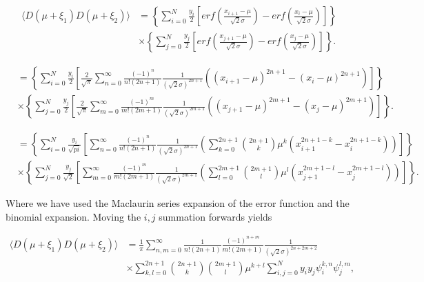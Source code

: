 \documentclass[apj]{emulateapj}
\begin{document}
\begin{equation}
\begin{aligned}
\langle D(\mu + \xi_1) D(\mu + \xi_2) \rangle &= \left\{ \sum_{i=0}^N  \frac{y_i}{2} \left[ erf \left( \frac{x_{i+1} - \mu}{\sqrt{2}\sigma} \right) - erf \left( \frac{x_{i} - \mu}{\sqrt{2}\sigma} \right) \right] \right\} \\
&\times \left\{  \sum_{j=0}^N \frac{y_j}{2} \left[ erf \left( \frac{x_{j+1} - \mu}{\sqrt{2}\sigma} \right) - erf \left( \frac{x_{j} - \mu}{\sqrt{2}\sigma} \right) \right] \right\}.
\end{aligned}
\end{equation}

\begin{equation}
\begin{aligned}
&= \left\{ \sum_{i=0}^N  \frac{y_i}{2} \left[ \frac{2}{\sqrt{\pi}} \sum_{n = 0}^\infty \frac{(-1)^n}{n! (2n+1)} \frac{1}{(\sqrt{2}\sigma)^{2n+1}} \left( (x_{i+1}-\mu)^{2n+1} - (x_{i}-\mu)^{2n+1} \right) \right] \right\} \\
&\times \left\{ \sum_{j=0}^N  \frac{y_j}{2} \left[ \frac{2}{\sqrt{\pi}} \sum_{m = 0}^\infty \frac{(-1)^m}{m! (2m+1)} \frac{1}{(\sqrt{2}\sigma)^{2m+1}} \left( (x_{j+1}-\mu)^{2m+1} - (x_{j}-\mu)^{2m+1} \right) \right] \right\}.
\end{aligned}
\end{equation}

\begin{equation}
\begin{aligned}
&= \left\{ \sum_{i=0}^N  \frac{y_i}{\sqrt{pi}} \left[ \sum_{n = 0}^\infty \frac{(-1)^n}{n! (2n+1)} \frac{1}{(\sqrt{2}\sigma)^{2n+1}} \left( \sum_{k=0}^{2n+1} {2n+1 \choose k} \mu^k ( x_{i+1}^{2n+1-k} - x_{i}^{2n+1-k} ) \right) \right] \right\} \\
&\times \left\{ \sum_{j=0}^N  \frac{y_j}{\sqrt{2}} \left[ \sum_{m = 0}^\infty \frac{(-1)^m}{m! (2m+1)} \frac{1}{(\sqrt{2}\sigma)^{2m+1}} \left( \sum_{l=0}^{2m+1} {2m+1 \choose l} \mu^l ( x_{j+1}^{2m+1-l} - x_{j}^{2m+1-l} ) \right) \right] \right\}.
\end{aligned}
\end{equation}

Where we have used the Maclaurin series expansion of the error function and the binomial expansion. Moving the $i, j$ summation forwards yields

\begin{equation} \label{eq:dcompleteklsum}
\begin{aligned}
\langle D(\mu + \xi_1) D(\mu + \xi_2) \rangle &=  \frac{1}{\pi} \sum_{n,m = 0}^\infty \frac{1}{n! (2n+1)} \frac{(-1)^{n+m}}{m! (2m+1)} \frac{1}{(\sqrt{2}\sigma)^{2n+2m+2}} \\
&\times \sum_{k, l = 0}^{2n+1} {2n+1 \choose k} {2m+1 \choose l} \mu^{k+l} \sum_{i,j=0}^N y_i y_j \psi^{k, n}_i \psi^{l, m}_j,
\end{aligned}
\end{equation}
\end{document}

